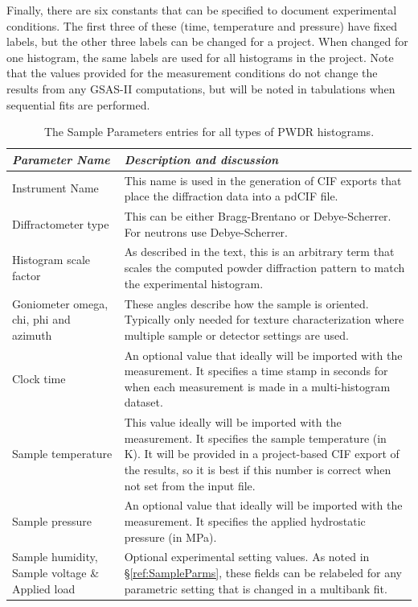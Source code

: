 Finally, there are six constants that can be specified to document experimental conditions. The first three of these (time, temperature and pressure) have fixed labels, but the other three labels can be changed for a project. When changed for one histogram, the same labels are used for all histograms in the project. Note that the values provided for the measurement conditions do not change the results from any GSAS-II computations, but will be noted in tabulations when sequential fits are performed. 

\begin{table}
\centering
\caption{The Sample Parameters entries for all types of PWDR histograms.}
\label{tab:CommonSample}
\begin{tabular}{| p{} | p{} |}
\hline
\textit{Parameter Name} & \textit{Description and discussion} \\
\hline
Instrument Name & This name is used in the generation of CIF exports that place the 
diffraction data into a pdCIF file.\\
\hline
Diffractometer type & This can be either Bragg-Brentano or Debye-Scherrer. For neutrons use Debye-Scherrer.\\
\hline
Histogram scale factor& As described in the text, this is an arbitrary term that scales the computed powder diffraction pattern to match the experimental histogram.\\
\hline
Goniometer omega, chi, phi and azimuth& These angles describe how the sample is oriented. Typically only needed for texture characterization where multiple sample or detector settings are used. \\
\hline
Clock time& An optional value that ideally will be imported with the measurement. It specifies a time stamp in seconds for when each measurement is made in a multi-histogram dataset.\\
\hline
Sample temperature& This value ideally will be imported with the measurement. It specifies the sample temperature (in K). It will be provided in a project-based CIF export of the results, so it is best if this number is correct when not set from the input file.\\
\hline
Sample pressure& An optional value that ideally will be imported with the measurement. It specifies the
applied hydrostatic pressure (in MPa).\\
\hline
Sample humidity, Sample voltage \& Applied load & Optional experimental setting values. As noted in \S\ref{ref:SampleParms}, these fields can be relabeled for any parametric setting that is changed in a multibank fit. \\
\hline
\end{tabular}
\end{table}


